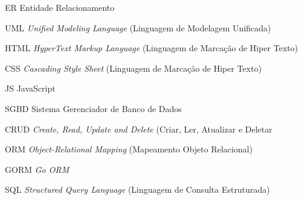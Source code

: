 %
%

\begin{siglas}
	\setlength{\baselineskip}{0.7\baselineskip}

    \item[ER] Entidade Relacionamento
    \item[UML] \textit{Unified Modeling Language} (Linguagem de Modelagem Unificada)
    \item[HTML] \textit{HyperText Markup Language} (Linguagem de Marcação de Hiper Texto)
    \item[CSS] \textit{Cascading Style Sheet} (Linguagem de Marcação de Hiper Texto)
    \item[JS] JavaScript
		\item[SGBD] Sistema Gerenciador de Banco de Dados
		\item[CRUD] \textit{Create, Read, Update and Delete} (Criar, Ler, Atualizar e Deletar
		\item[ORM] \textit{Object-Relational Mapping} (Mapeamento Objeto Relacional)
		\item[GORM] \textit{Go ORM}
		\item[SQL] \textit{Structured Query Language} (Linguagem de Consulta Estruturada)

\end{siglas}
